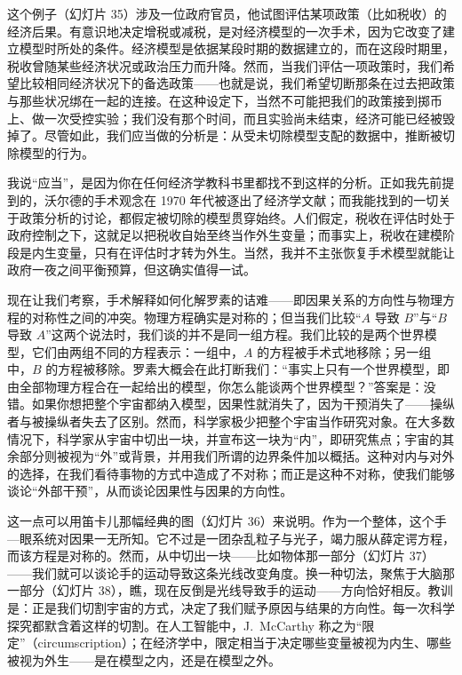 这个例子（幻灯片 35）涉及一位政府官员，他试图评估某项政策（比如税收）的经济后果。有意识地决定增税或减税，是对经济模型的一次手术，因为它改变了建立模型时所处的条件。经济模型是依据某段时期的数据建立的，而在这段时期里，税收曾随某些经济状况或政治压力而升降。然而，当我们评估一项政策时，我们希望比较相同经济状况下的备选政策——也就是说，我们希望切断那条在过去把政策与那些状况绑在一起的连接。在这种设定下，当然不可能把我们的政策接到掷币上、做一次受控实验；我们没有那个时间，而且实验尚未结束，经济可能已经被毁掉了。尽管如此，我们应当做的分析是：从受未切除模型支配的数据中，推断被切除模型的行为。

\begin{center}
\end{center}

我说“应当”，是因为你在任何经济学教科书里都找不到这样的分析。正如我先前提到的，沃尔德的手术观念在 1970 年代被逐出了经济学文献；而我能找到的一切关于政策分析的讨论，都假定被切除的模型贯穿始终。人们假定，税收在评估时处于政府控制之下，这就足以把税收自始至终当作外生变量；而事实上，税收在建模阶段是内生变量，只有在评估时才转为外生。当然，我并不主张恢复手术模型就能让政府一夜之间平衡预算，但这确实值得一试。

现在让我们考察，手术解释如何化解罗素的诘难——即因果关系的方向性与物理方程的对称性之间的冲突。物理方程确实是对称的；但当我们比较“$A$ 导致 $B$”与“$B$ 导致 $A$”这两个说法时，我们谈的并不是同一组方程。我们比较的是两个世界模型，它们由两组不同的方程表示：一组中，$A$ 的方程被手术式地移除；另一组中，$B$ 的方程被移除。罗素大概会在此打断我们：“事实上只有一个世界模型，即由全部物理方程合在一起给出的模型，你怎么能谈两个世界模型？”答案是：没错。如果你想把整个宇宙都纳入模型，因果性就消失了，因为干预消失了——操纵者与被操纵者失去了区别。然而，科学家极少把整个宇宙当作研究对象。在大多数情况下，科学家从宇宙中切出一块，并宣布这一块为“内”，即研究焦点；宇宙的其余部分则被视为“外”或背景，并用我们所谓的边界条件加以概括。这种对内与对外的选择，在我们看待事物的方式中造成了不对称；而正是这种不对称，使我们能够谈论“外部干预”，从而谈论因果性与因果的方向性。

这一点可以用笛卡儿那幅经典的图（幻灯片 36）来说明。作为一个整体，这个手—眼系统对因果一无所知。它不过是一团杂乱粒子与光子，竭力服从薛定谔方程，而该方程是对称的。然而，从中切出一块——比如物体那一部分（幻灯片 37）——我们就可以谈论手的运动导致这条光线改变角度。换一种切法，聚焦于大脑那一部分（幻灯片 38），瞧，现在反倒是光线导致手的运动——方向恰好相反。教训是：正是我们切割宇宙的方式，决定了我们赋予原因与结果的方向性。每一次科学探究都默含着这样的切割。在人工智能中，J.~McCarthy 称之为“限定”（circumscription）；在经济学中，限定相当于决定哪些变量被视为内生、哪些被视为外生——是在模型之内，还是在模型之外。

